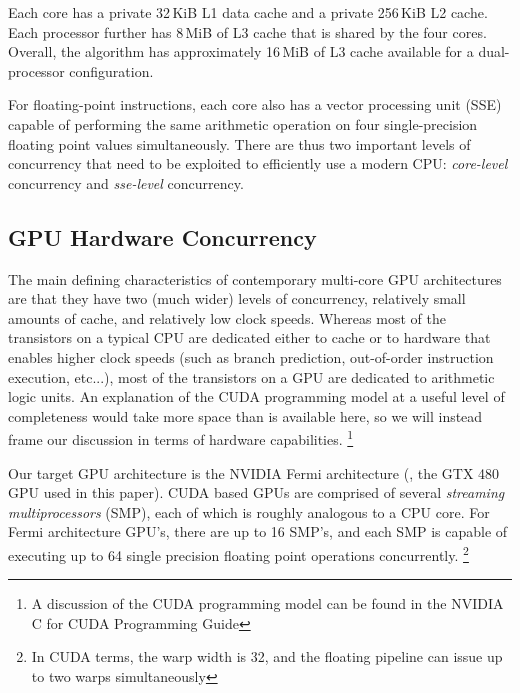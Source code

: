 \documentclass[10pt,twocolumn,letterpaper]{article}
\begin{document}
Each core has a private 32\,KiB L1 data cache and a private 256\,KiB L2 cache.
Each processor further has 8\,MiB of L3 cache that is shared by the four cores.
Overall, the algorithm has approximately 16\,MiB of L3 cache
available for a dual-processor configuration.  

For floating-point instructions, each core also has a vector processing unit
(SSE) capable of performing the same arithmetic operation on four single-precision 
floating point values simultaneously.
There are thus two important levels of concurrency that need to be exploited to
efficiently use a modern CPU: {\em core-level} concurrency and {\em sse-level}
concurrency. 

\subsection{GPU Hardware Concurrency}
The main defining characteristics of contemporary multi-core GPU architectures
are that they have two (much wider) levels of concurrency, relatively small amounts of
 cache, and relatively low clock speeds.  Whereas most of the transistors on
a typical CPU are dedicated either to cache or to hardware that enables higher
clock speeds (such as branch prediction, out-of-order instruction execution, etc...),
most of the transistors on a GPU are dedicated to arithmetic logic units.
An explanation of the CUDA programming model at a useful level of completeness would take 
more space than is available here, so we will instead frame our discussion in terms of 
hardware capabilities. \footnote{A discussion of the CUDA programming model can be found
in the NVIDIA C for CUDA Programming Guide}

Our target GPU architecture is the NVIDIA Fermi architecture (\eg, the GTX 480
GPU used in this paper).  CUDA based GPUs are comprised of several
\emph{streaming multiprocessors} (SMP), each of which is roughly analogous to a CPU core.
For Fermi architecture GPU's, there are up to 16 SMP's, and each SMP is capable of executing up to 64 single precision 
floating point operations
concurrently. \footnote{In CUDA terms, the warp width is 32, and the floating pipeline can
issue up to two warps simultaneously}
\end{document}
